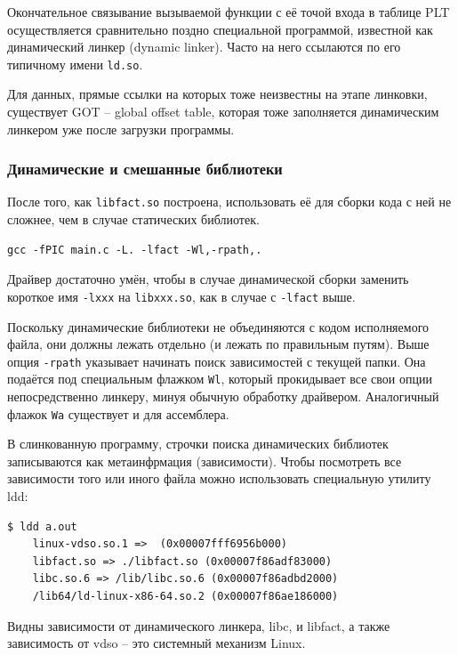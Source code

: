 \documentclass[a4paper,12pt,oneside]{article}
\begin{document}
Окончательное связывание вызываемой функции с её точой входа в таблице PLT осуществляется сравнительно поздно специальной программой, известной как динамический линкер (dynamic linker). Часто на него ссылаются по его типичному имени \lstinline!ld.so!.

Для данных, прямые ссылки на которых тоже неизвестны на этапе линковки, существует GOT -- global offset table, которая тоже заполняется динамическим линкером уже после загрузки программы.

\subsubsection{Динамические и смешанные библиотеки}\label{subsubsec:Mixlib}

После того, как \lstinline!libfact.so! построена, использовать её для сборки кода с ней не сложнее, чем в случае статических библиотек.

\begin{verbatim}
gcc -fPIC main.c -L. -lfact -Wl,-rpath,.
\end{verbatim}

Драйвер достаточно умён, чтобы в случае динамической сборки заменить короткое имя \lstinline!-lxxx! на \lstinline!libxxx.so!, как в случае с \lstinline!-lfact! выше.

Поскольку динамические библиотеки не объединяются с кодом исполняемого файла, они должны лежать отдельно (и лежать по правильным путям). Выше опция \lstinline!-rpath! указывает начинать поиск зависимостей с текущей папки. Она подаётся под специальным флажком \lstinline!Wl!, который прокидывает все свои опции непосредственно линкеру, минуя обычную обработку драйвером. Аналогичный флажок \lstinline!Wa! существует и для ассемблера.

В слинкованную программу, строчки поиска динамических библиотек записываются как метаинфрмация (зависимости). Чтобы посмотреть все зависимости того или иного файла можно использовать специальную утилиту ldd:

\begin{verbatim}
$ ldd a.out 
	linux-vdso.so.1 =>  (0x00007fff6956b000)
	libfact.so => ./libfact.so (0x00007f86adf83000)
	libc.so.6 => /lib/libc.so.6 (0x00007f86adbd2000)
	/lib64/ld-linux-x86-64.so.2 (0x00007f86ae186000)
\end{verbatim}

Видны зависимости от динамического линкера, libc, и libfact, а также зависимость от vdso -- это системный механизм Linux.
\end{document}
